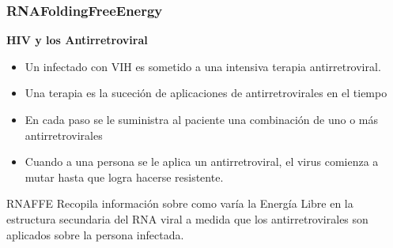 \begin{frame}
\begin{center}
        \end{center}
\end{frame}

\begin{frame}\frametitle{RNAFoldingFreeEnergy}
    \textbf{HIV y los Antirretroviral}
    \begin{itemize}
     \item Un infectado con VIH es sometido a una intensiva terapia antirretroviral.
     \item Una terapia es la suceción de aplicaciones de antirretrovirales en el tiempo
     \item En cada paso se le suministra al paciente una combinación de uno o más antirretrovirales
     \item Cuando a una persona se le aplica un antirretroviral, el virus comienza a mutar hasta que logra hacerse resistente. 
    \end{itemize}



\begin{block}{RNAFFE}
    Recopila informaci\'on sobre como var\'ia la Energ\'ia Libre en la estructura secundaria del RNA viral a medida que los
    antirretrovirales son aplicados sobre la persona infectada.
\end{block}

\end{frame}

